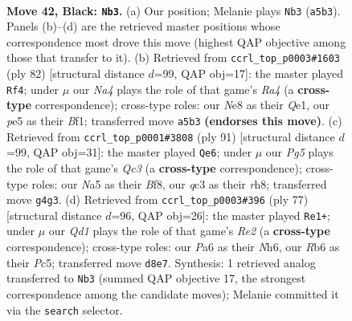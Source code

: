 \documentclass[11pt]{article}
\begin{document}
\clearpage

\begin{figure}[p]\centering
\begin{subfigure}{0.46\textwidth}\centering
\resizebox{\linewidth}{!}{%
\newchessgame
\chessboard[
  setfen={B2qn3/3b2k1/pr6/n3Pp1p/P2P2p1/N1Q5/5PPP/R3K1N1 b - - 7 42},
  showmover=false,
  pgfstyle=straightmove, color=movearrow, markmove={a5-b3}
]}
\caption{}
\end{subfigure}\hfill
\begin{subfigure}{0.46\textwidth}\centering
\resizebox{\linewidth}{!}{%
\newchessgame
\chessboard[
  setfen={1r1q2k1/5p2/1n2p1p1/2p1Nb1p/R6P/PP4P1/2P5/2K1QB2 w - - 1 42},
  showmover=false,
  pgfstyle=straightmove, color=movearrow, markmove={a4-f4}
]}
\caption{}
\end{subfigure}
\\[4pt]
\begin{subfigure}{0.46\textwidth}\centering
\resizebox{\linewidth}{!}{%
\newchessgame
\chessboard[
  setfen={5b1R/p3k1p1/1pq3P1/3pPp2/3BnP2/PP5Q/2r5/6RK b - - 2 46},
  showmover=false,
  pgfstyle=straightmove, color=movearrow, markmove={c6-e6}
]}
\caption{}
\end{subfigure}\hfill
\begin{subfigure}{0.46\textwidth}\centering
\resizebox{\linewidth}{!}{%
\newchessgame
\chessboard[
  setfen={6k1/pp1br2p/3p3n/2pP2q1/P7/R2B1QNP/1P4P1/7K b - - 2 39},
  showmover=false,
  pgfstyle=straightmove, color=movearrow, markmove={e7-e1}
]}
\caption{}
\end{subfigure}
\caption{\textbf{Move 42, Black: \texttt{Nb3}.} (a) Our position; Melanie plays \texttt{Nb3} (\texttt{a5b3}). Panels (b)--(d) are the retrieved master positions whose correspondence most drove this move (highest QAP objective among those that transfer to it). (b) Retrieved from \texttt{ccrl\_top\_p0003\#1603} (ply 82) [structural distance $d$=99, QAP obj=17]: the master played \texttt{Rf4}; under $\mu$ our \emph{Na4} plays the role of that game's \emph{Ra4} (a \textbf{cross-type} correspondence); cross-type roles: our \emph{N}e8 as their \emph{Q}e1, our \emph{p}e5 as their \emph{B}f1; transferred move \texttt{a5b3} \textbf{(endorses this move)}. (c) Retrieved from \texttt{ccrl\_top\_p0001\#3808} (ply 91) [structural distance $d$=99, QAP obj=31]: the master played \texttt{Qe6}; under $\mu$ our \emph{Pg5} plays the role of that game's \emph{Qc3} (a \textbf{cross-type} correspondence); cross-type roles: our \emph{N}a5 as their \emph{B}f8, our \emph{q}c3 as their \emph{r}h8; transferred move \texttt{g4g3}. (d) Retrieved from \texttt{ccrl\_top\_p0003\#396} (ply 77) [structural distance $d$=96, QAP obj=26]: the master played \texttt{Re1+}; under $\mu$ our \emph{Qd1} plays the role of that game's \emph{Re2} (a \textbf{cross-type} correspondence); cross-type roles: our \emph{P}a6 as their \emph{N}h6, our \emph{R}b6 as their \emph{P}c5; transferred move \texttt{d8e7}. Synthesis: 1 retrieved analog transferred to \texttt{Nb3} (summed QAP objective 17, the strongest correspondence among the candidate moves); Melanie committed it via the \texttt{search} selector.}
\label{fig:thought-m83}
\end{figure}
\end{document}

